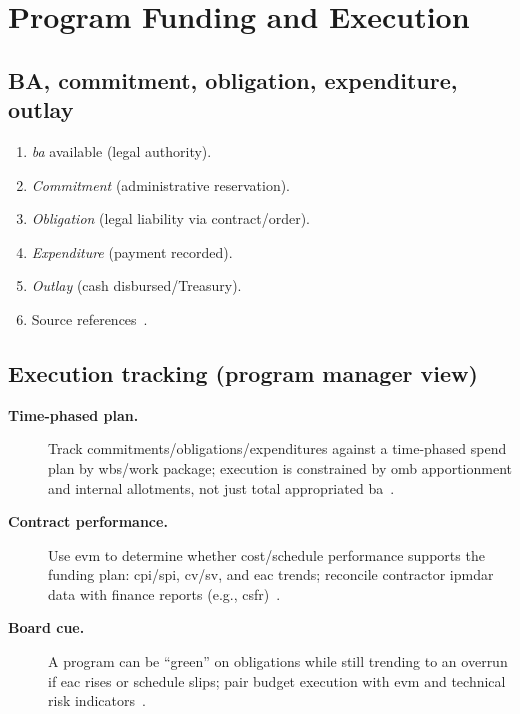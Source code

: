 \documentclass[../main.tex]{subfiles}
\begin{document}

\section{Program Funding and Execution}
\subsection{BA, commitment, obligation, expenditure, outlay}
\begin{enumerate}
  \item \emph{\ac{ba}} available (legal authority).
  \item \emph{Commitment} (administrative reservation).
  \item \emph{Obligation} (legal liability via contract/order).
  \item \emph{Expenditure} (payment recorded).
  \item \emph{Outlay} (cash disbursed/Treasury).
  \item[] Source references~\autocite{DoDFMR-Vol3,Treasury-GInvoicing}.
\end{enumerate}

\subsection{Execution tracking (program manager view)}
\begin{description}
  \item[\textbf{Time-phased plan.}] Track commitments/obligations/expenditures against a time-phased spend plan by \ac{wbs}/work package; execution is constrained by \ac{omb} apportionment and internal allotments, not just total appropriated \ac{ba}~\autocite{DoDFMR-Vol3,OMB-A11,edo-3-1-4-budget-execution-2025}.
  \item[\textbf{Contract performance.}] Use \ac{evm} to determine whether cost/schedule performance supports the funding plan: \ac{cpi}/\ac{spi}, \ac{cv}/\ac{sv}, and \ac{eac} trends; reconcile contractor \ac{ipmdar} data with finance reports (e.g., \ac{csfr})~\autocite{edo-3-6-1-evm-intro-2025,edo-3-6-2-evm-analysis-2025}.
  \item[\textbf{Board cue.}] A program can be ``green'' on obligations while still trending to an overrun if \ac{eac} rises or schedule slips; pair budget execution with \ac{evm} and technical risk indicators~\autocite{edo-3-6-2-evm-analysis-2025}.
\end{description}
\end{document}
